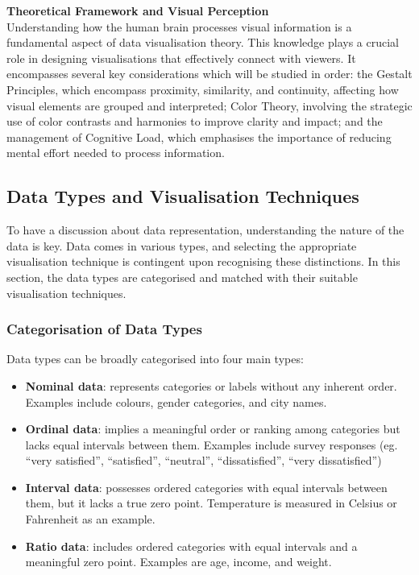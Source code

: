 \documentclass{article}\usepackage[]{graphicx}\usepackage[]{xcolor}
\numberwithin{equation}{section}
\begin{document}
\noindent \textbf{Theoretical Framework and Visual Perception}\\
Understanding how the human brain processes visual information is a fundamental aspect of data visualisation theory. This knowledge plays a crucial role in designing visualisations that effectively connect with viewers. It encompasses several key considerations which will be studied in order: the Gestalt Principles, which encompass proximity, similarity, and continuity, affecting how visual elements are grouped and interpreted; Color Theory, involving the strategic use of color contrasts and harmonies to improve clarity and impact; and the management of Cognitive Load, which emphasises the importance of reducing mental effort needed to process information.

\subsection{Data Types and Visualisation Techniques}
To have a discussion about data representation, understanding the nature of the data is key. Data comes in various types, and selecting the appropriate visualisation technique is contingent upon recognising these distinctions. In this section, the data types are categorised and matched with their suitable visualisation techniques.

\subsubsection{Categorisation of Data Types}
Data types can be broadly categorised into four main types: 
\begin{itemize}
    \item \textbf{Nominal data}: represents categories or labels without any inherent order. Examples include colours, gender categories, and city names. 
    \item \textbf{Ordinal data}: implies a meaningful order or ranking among categories but lacks equal intervals between them. Examples include survey responses (eg. “very satisfied”, “satisfied”, “neutral”, “dissatisfied”, “very dissatisfied”)
    \item \textbf{Interval data}: possesses ordered categories with equal intervals between them, but it lacks a true zero point. Temperature is measured in Celsius or Fahrenheit as an example. 
    \item \textbf{Ratio data}: includes ordered categories with equal intervals and a meaningful zero point. Examples are age, income, and weight. 
\end{itemize}
\end{document}
